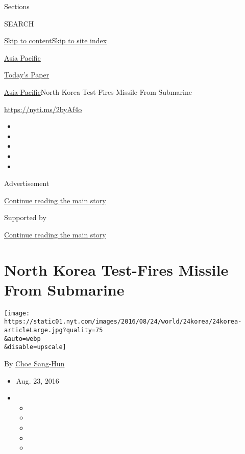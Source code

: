 Sections

SEARCH

\protect\hyperlink{site-content}{Skip to
content}\protect\hyperlink{site-index}{Skip to site index}

\href{https://www.nytimes.com/section/world/asia}{Asia Pacific}

\href{https://myaccount.nytimes.com/auth/login?response_type=cookie\&client_id=vi}{}

\href{https://www.nytimes.com/section/todayspaper}{Today's Paper}

\href{/section/world/asia}{Asia Pacific}\textbar{}North Korea Test-Fires
Missile From Submarine

\url{https://nyti.ms/2byAf4o}

\begin{itemize}
\item
\item
\item
\item
\item
\end{itemize}

Advertisement

\protect\hyperlink{after-top}{Continue reading the main story}

Supported by

\protect\hyperlink{after-sponsor}{Continue reading the main story}

\hypertarget{north-korea-test-fires-missile-from-submarine}{%
\section{North Korea Test-Fires Missile From
Submarine}\label{north-korea-test-fires-missile-from-submarine}}

\texttt{[image: https://static01.nyt.com/images/2016/08/24/world/24korea/24korea-articleLarge.jpg?quality=75\\\&auto=webp\\\&disable=upscale]}

By \href{http://www.nytimes.com/by/choe-sang-hun}{Choe Sang-Hun}

\begin{itemize}
\item
  Aug. 23, 2016
\item
  \begin{itemize}
  \item
  \item
  \item
  \item
  \item
  \end{itemize}
\end{itemize}


